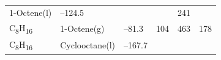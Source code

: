 \documentclass[
]{book}
\theoremstyle{definition}
\theoremstyle{definition}
\theoremstyle{definition}
\theoremstyle{remark}
\begin{document}
\begin{longtable}[]{@{}llllll@{}}
\begin{minipage}[t]{0.17\columnwidth}
1-Octene(l)\strut
\end{minipage} & \begin{minipage}[t]{0.15\columnwidth}\raggedright
--124.5\strut
\end{minipage} & \begin{minipage}[t]{0.15\columnwidth}\raggedright
\strut
\end{minipage} & \begin{minipage}[t]{0.14\columnwidth}\raggedright
\strut
\end{minipage} & \begin{minipage}[t]{0.14\columnwidth}\raggedright
241\strut
\end{minipage}\tabularnewline
\begin{minipage}[t]{0.07\columnwidth}\raggedright
C\textsubscript{8}H\textsubscript{16}\strut
\end{minipage} & \begin{minipage}[t]{0.17\columnwidth}\raggedright
1-Octene(g)\strut
\end{minipage} & \begin{minipage}[t]{0.15\columnwidth}\raggedright
--81.3\strut
\end{minipage} & \begin{minipage}[t]{0.15\columnwidth}\raggedright
104\strut
\end{minipage} & \begin{minipage}[t]{0.14\columnwidth}\raggedright
463\strut
\end{minipage} & \begin{minipage}[t]{0.14\columnwidth}\raggedright
178\strut
\end{minipage}\tabularnewline
\begin{minipage}[t]{0.07\columnwidth}\raggedright
C\textsubscript{8}H\textsubscript{16}\strut
\end{minipage} & \begin{minipage}[t]{0.17\columnwidth}\raggedright
Cyclooctane(l)\strut
\end{minipage} & \begin{minipage}[t]{0.15\columnwidth}\raggedright
--167.7\strut
\end{minipage} & \begin{minipage}[t]{0.15\columnwidth}\raggedright
\strut
\end{minipage} & \begin{minipage}[t]{0.14\columnwidth}\raggedright
\strut
\end{minipage} & \begin{minipage}[t]{0.14\columnwidth}\raggedright

\end{minipage}
\end{longtable}
\end{document}
